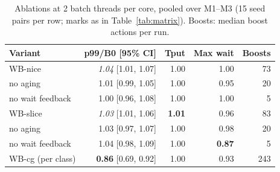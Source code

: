 \begin{table}[t]
\centering
\footnotesize
\caption{Ablations at 2 batch threads per core, pooled over M1--M3 (15 seed pairs per row; marks as in Table~\ref{tab:matrix}). Boosts: median boost actions per run.}
\label{tab:ablation}
\setlength{\tabcolsep}{4pt}
\begin{tabular}{@{}lrrrr@{}}
\toprule
Variant & p99/B0 [95\% CI] & Tput & Max wait & Boosts \\
\midrule
WB-nice & \textit{1.04} {\scriptsize[1.01, 1.07]} & 1.00 & 1.00 & 73 \\
\quad no aging & 1.01 {\scriptsize[0.99, 1.05]} & 1.00 & 0.95 & 20 \\
\quad no wait feedback & 1.00 {\scriptsize[0.96, 1.08]} & 1.00 & 1.00 & 5 \\
WB-slice & \textit{1.03} {\scriptsize[1.01, 1.06]} & \textbf{1.01} & 0.96 & 83 \\
\quad no aging & 1.03 {\scriptsize[0.97, 1.07]} & 1.00 & 0.98 & 20 \\
\quad no wait feedback & 1.04 {\scriptsize[0.98, 1.09]} & 1.00 & \textbf{0.87} & 5 \\
WB-cg (per class) & \textbf{0.86} {\scriptsize[0.69, 0.92]} & 1.00 & 0.93 & 243 \\
\bottomrule
\end{tabular}
\end{table}
